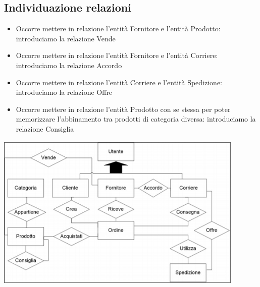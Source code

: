 \subsection{Individuazione relazioni}
\begin{itemize}
	\item Occorre mettere in relazione l’entità Fornitore e l’entità Prodotto: introduciamo la relazione Vende
	\item Occorre mettere in relazione l’entità Fornitore e l’entità Corriere: introduciamo la relazione Accordo
	\item Occorre mettere in relazione l’entità Corriere e l’entità Spedizione: introduciamo la relazione Offre
	\item Occorre mettere in relazione l’entità Prodotto con se stessa per poter memorizzare l’abbinamento tra prodotti di categoria diversa: introduciamo la
	relazione Consiglia
\end{itemize}
\begin{center}
	\includegraphics{images/88.PNG}
\end{center}
